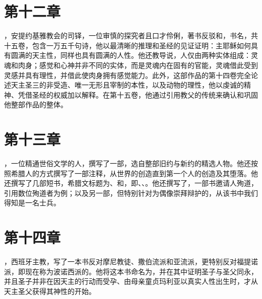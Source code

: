 
\section{第十二章}

，安提约基雅教会的司铎，一位审慎的探究者且口才伶俐，著书反驳和，书名，共十五卷，包含一万五千句诗，他以最清晰的推理和圣经的见证证明：主耶稣如何具有圆满的天主性，同样也具有圆满的人性。他还教导说，人仅由两种实体组成：灵魂和肉身；感觉和心神并非不同的实体，而是灵魂内在固有的官能，灵魂借此受到灵感并具有理性，并借此使肉身拥有感觉能力。此外，这部作品的第十四卷完全论述天主圣三的非受造、唯一无形且宰制的本性，以及动物的理性，他以虔诚的精神、凭借圣经的权威加以解释。在第十五卷，他通过引用教父的传统来确认和巩固他整部作品的整体。\par


\section{第十三章}

，一位精通世俗文学的人，撰写了一部，选自整部旧约与新约的精选人物。他还按照希腊人的方式撰写了一部注释，从世界的创造直到第一个人的创造及其堕落。他还撰写了几部短书，希腊文标题为、和，即、、。他还撰写了，一部书邀请人殉道，引用数位殉道者为例；以及另一部，但特别针对为偶像崇拜辩护的，从该书中我们得知是一名士兵。\par


\section{第十四章}

，西班牙主教，写了一本书反对摩尼教徒、撒伯流派和亚流派，更特别反对福提诺派，即现在称为波诺西派的。他将这本书命名为，并在其中证明圣子与圣父同永，并且圣子并非在因天主的行动而受孕、由母亲童贞玛利亚以真实人性出生时，才从天主圣父获得其神性的开始。\par


